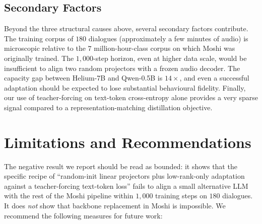 \documentclass[conference]{IEEEtran}
\begin{document}
\subsection{Secondary Factors}

Beyond the three structural causes above, several secondary factors contribute. The training corpus of $180$ dialogues (approximately a few minutes of audio) is microscopic relative to the $7$ million-hour-class corpus on which Moshi was originally trained. The $1{,}000$-step horizon, even at higher data scale, would be insufficient to align two random projectors with a frozen audio decoder. The capacity gap between Helium-7B and Qwen-0.5B is $14\times$, and even a successful adaptation should be expected to lose substantial behavioural fidelity. Finally, our use of teacher-forcing on text-token cross-entropy alone provides a very sparse signal compared to a representation-matching distillation objective.

\section{Limitations and Recommendations}
\label{sec:limit}

The negative result we report should be read as bounded: it shows that the specific recipe of ``random-init linear projectors plus low-rank-only adaptation against a teacher-forcing text-token loss'' fails to align a small alternative LLM with the rest of the Moshi pipeline within $1{,}000$ training steps on $180$ dialogues. It does \emph{not} show that backbone replacement in Moshi is impossible. We recommend the following measures for future work:
\end{document}
